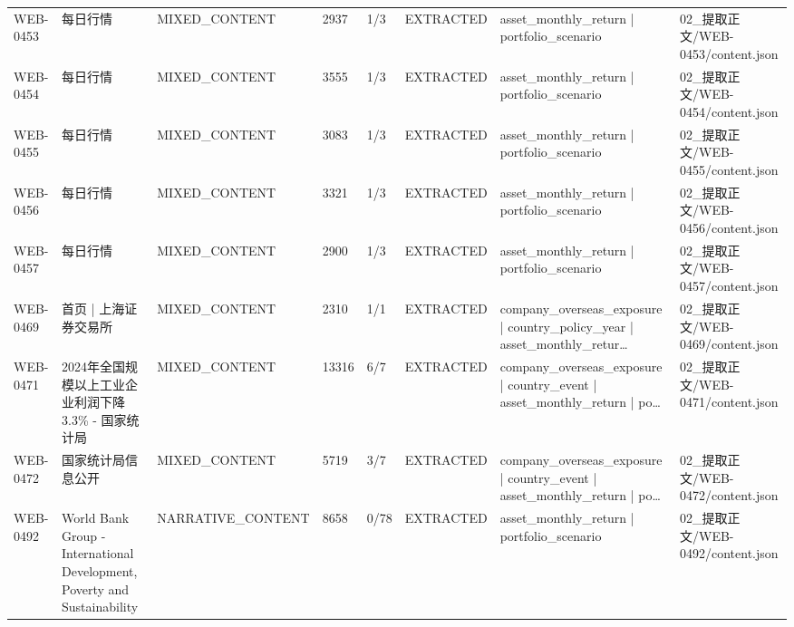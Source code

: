\begin{landscape}
\begin{longtable}{p{1.8cm}p{4.2cm}p{3.0cm}p{1.4cm}p{1.6cm}p{2.4cm}p{4.2cm}p{4.2cm}}
WEB-0453 & 每日行情 & MIXED\_\allowbreak{}CONTENT & 2937 & 1/\allowbreak{}3 & EXTRACTED & asset\_\allowbreak{}monthly\_\allowbreak{}return | portfolio\_\allowbreak{}scenario & 02\_\allowbreak{}提取正文/\allowbreak{}WEB-0453/\allowbreak{}content.json\\
WEB-0454 & 每日行情 & MIXED\_\allowbreak{}CONTENT & 3555 & 1/\allowbreak{}3 & EXTRACTED & asset\_\allowbreak{}monthly\_\allowbreak{}return | portfolio\_\allowbreak{}scenario & 02\_\allowbreak{}提取正文/\allowbreak{}WEB-0454/\allowbreak{}content.json\\
WEB-0455 & 每日行情 & MIXED\_\allowbreak{}CONTENT & 3083 & 1/\allowbreak{}3 & EXTRACTED & asset\_\allowbreak{}monthly\_\allowbreak{}return | portfolio\_\allowbreak{}scenario & 02\_\allowbreak{}提取正文/\allowbreak{}WEB-0455/\allowbreak{}content.json\\
WEB-0456 & 每日行情 & MIXED\_\allowbreak{}CONTENT & 3321 & 1/\allowbreak{}3 & EXTRACTED & asset\_\allowbreak{}monthly\_\allowbreak{}return | portfolio\_\allowbreak{}scenario & 02\_\allowbreak{}提取正文/\allowbreak{}WEB-0456/\allowbreak{}content.json\\
WEB-0457 & 每日行情 & MIXED\_\allowbreak{}CONTENT & 2900 & 1/\allowbreak{}3 & EXTRACTED & asset\_\allowbreak{}monthly\_\allowbreak{}return | portfolio\_\allowbreak{}scenario & 02\_\allowbreak{}提取正文/\allowbreak{}WEB-0457/\allowbreak{}content.json\\
WEB-0469 & 首页 | 上海证券交易所 & MIXED\_\allowbreak{}CONTENT & 2310 & 1/\allowbreak{}1 & EXTRACTED & company\_\allowbreak{}overseas\_\allowbreak{}exposure | country\_\allowbreak{}policy\_\allowbreak{}year | asset\_\allowbreak{}monthly\_\allowbreak{}retur… & 02\_\allowbreak{}提取正文/\allowbreak{}WEB-0469/\allowbreak{}content.json\\
WEB-0471 & 2024年全国规模以上工业企业利润下降3.3\% - 国家统计局 & MIXED\_\allowbreak{}CONTENT & 13316 & 6/\allowbreak{}7 & EXTRACTED & company\_\allowbreak{}overseas\_\allowbreak{}exposure | country\_\allowbreak{}event | asset\_\allowbreak{}monthly\_\allowbreak{}return | po… & 02\_\allowbreak{}提取正文/\allowbreak{}WEB-0471/\allowbreak{}content.json\\
WEB-0472 & 国家统计局信息公开 & MIXED\_\allowbreak{}CONTENT & 5719 & 3/\allowbreak{}7 & EXTRACTED & company\_\allowbreak{}overseas\_\allowbreak{}exposure | country\_\allowbreak{}event | asset\_\allowbreak{}monthly\_\allowbreak{}return | po… & 02\_\allowbreak{}提取正文/\allowbreak{}WEB-0472/\allowbreak{}content.json\\
WEB-0492 & World Bank Group - International Development, Poverty and Sustainability & NARRATIVE\_\allowbreak{}CONTENT & 8658 & 0/\allowbreak{}78 & EXTRACTED & asset\_\allowbreak{}monthly\_\allowbreak{}return | portfolio\_\allowbreak{}scenario & 02\_\allowbreak{}提取正文/\allowbreak{}WEB-0492/\allowbreak{}content.json\\

\end{longtable}
\end{landscape}
